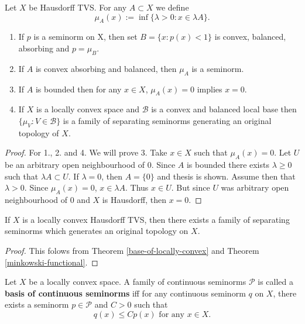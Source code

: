 \documentclass[main.tex]{subfiles}
\begin{document}
\begin{theorem}
\label{minkowski-functional}
Let $X$ be Hausdorff TVS. For any $A\subset X$ we define
\begin{equation}
\mu_A(x) := \inf\{\lambda > 0: x\in \lambda A\}.
\end{equation} 
\begin{enumerate}
\item If $p$ is a seminorm on X, then set $B=\{x:p(x) < 1\}$ is convex, balanced, absorbing and $p=\mu_B$.
\item If $A$ is convex absorbing and balanced, then $\mu_A$ is a seminorm.
\item If $A$ is bounded then for any $x\in X$, $\mu_A(x) = 0$ implies $x = 0$.
\item If $X$ is a locally convex space and $\mathcal{B}$ is a convex and balanced local base then $\{\mu_V: V\in \mathcal{B}\}$ is a family of separating seminorms generating an original topology of $X$. 
\end{enumerate}
\end{theorem}
\begin{proof}
For 1., 2. and 4. 
\cite[See][Seminorms and Local Convexity]{rudin1991}
We will prove 3. Take $x\in X$ such that $\mu_A(x) = 0$.
Let $U$ be an arbitrary open neighbourhood of $0$. Since $A$ is bounded there exists $\lambda \geq 0$ such that $\lambda A\subset U$. If $\lambda = 0$, then $A=\{0\}$ and thesis is shown. Assume then that $\lambda > 0$. Since $\mu_A(x) = 0$, $x\in \lambda A$. Thus $x\in U$. But since $U$ was arbitrary open neighbourhood of $0$ and $X$ is Hausdorff, then $x = 0$.
\end{proof}
\begin{corollary}
If $X$ is a locally convex Hausdorff TVS, then there exists a family of separating seminorms which generates an original topology on $X$.
\end{corollary}
\begin{proof}
This folows from Theorem \ref{base-of-locally-convex} and Theorem \ref{minkowski-functional}.
\end{proof}

\begin{definition}
Let $X$ be a locally convex space. A family of continuous seminorms $\mathcal{P}$ is called a \textbf{basis of continuous seminorms} iff for any continuous seminorm $q$ on $X$, there exists a seminorm $p\in\mathcal{P}$ and $C > 0$ such that 
\begin{equation}
q(x) \leq Cp(x) \text{ for any } x\in X.
\end{equation} 
\end{definition}
\end{document}
